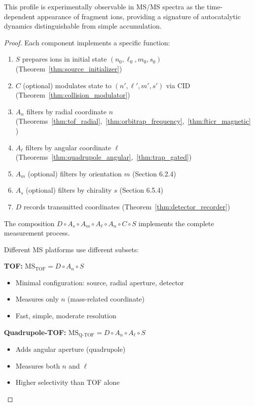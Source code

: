 This profile is experimentally observable in MS/MS spectra as the time-dependent appearance of fragment ions, providing a signature of autocatalytic dynamics distinguishable from simple accumulation.

\begin{proof}
Each component implements a specific function:
\begin{enumerate}
    \item $S$ prepares ions in initial state $(n_0, \ell_0, m_0, s_0)$ (Theorem~\ref{thm:source_initializer})
    \item $C$ (optional) modulates state to $(n', \ell', m', s')$ via CID (Theorem~\ref{thm:collision_modulator})
    \item $A_n$ filters by radial coordinate $n$ (Theorems~\ref{thm:tof_radial},~\ref{thm:orbitrap_frequency},~\ref{thm:fticr_magnetic})
    \item $A_\ell$ filters by angular coordinate $\ell$ (Theorems~\ref{thm:quadrupole_angular},~\ref{thm:trap_gated})
    \item $A_m$ (optional) filters by orientation $m$ (Section 6.2.4)
    \item $A_s$ (optional) filters by chirality $s$ (Section 6.5.4)
    \item $D$ records transmitted coordinates (Theorem~\ref{thm:detector_recorder})
\end{enumerate}

The composition $D \circ A_s \circ A_m \circ A_\ell \circ A_n \circ C \circ S$ implements the complete measurement process.

Different MS platforms use different subsets:

\textbf{TOF:} $\text{MS}_{\text{TOF}} = D \circ A_n \circ S$
\begin{itemize}
    \item Minimal configuration: source, radial aperture, detector
    \item Measures only $n$ (mass-related coordinate)
    \item Fast, simple, moderate resolution
\end{itemize}

\textbf{Quadrupole-TOF:} $\text{MS}_{\text{Q-TOF}} = D \circ A_n \circ A_\ell \circ S$
\begin{itemize}
    \item Adds angular aperture (quadrupole)
    \item Measures both $n$ and $\ell$
    \item Higher selectivity than TOF alone
\end{itemize}


\end{proof}
